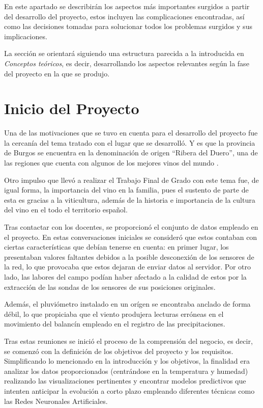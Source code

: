 
En este apartado se describirán los aspectos más importantes surgidos a partir del desarrollo del proyecto,
estos incluyen las complicaciones encontradas, así como las decisiones tomadas para solucionar todos los
problemas surgidos y sus implicaciones.

La sección se orientará siguiendo una estructura parecida a la introducida en \textit{Conceptos teóricos}, 
es decir, desarrollando los aspectos relevantes según la fase del proyecto en la que se produjo.

\section{Inicio del Proyecto}
Una de las motivaciones que se tuvo en cuenta para el desarrollo del proyecto fue la cercanía del tema tratado
con el lugar que se desarrolló. Y es que la provincia de Burgos se encuentra en la denominación de
origen ``Ribera del Duero'', una de las regiones que cuenta con algunos de los mejores vinos del mundo \cite{misc:abc2021}.

Otro impulso que llevó a realizar el Trabajo Final de Grado con este tema fue, de igual forma, la importancia 
del vino en la familia, pues el sustento de parte de esta es gracias a la viticultura, además de la historia
e importancia de la cultura del vino en el todo el territorio español.

Tras contactar con los docentes, se proporcionó el conjunto de datos empleado en el proyecto. En estas conversaciones
iniciales se consideró que estos contaban con ciertas características que debían tenerse en cuenta: en primer lugar,
los presentaban valores faltantes debidos a la posible desconexión de los sensores de la red, lo que provocaba
que estos dejaran de enviar datos al servidor. Por otro lado, las labores del campo podían haber afectado a la calidad
de estos por la extracción de las sondas de los sensores de sus posiciones originales.

Además, el pluviómetro instalado en un orígen se encontraba anclado de forma débil, lo que propiciaba que el viento 
produjera lecturas erróneas en el movimiento del balancín empleado en el registro de las precipitaciones.

Tras estas reuniones se inició el proceso de la comprensión del negocio, es decir, se comenzó con la definición de los 
objetivos del proyecto y los requisitos. Simplificando lo mencionado en la introducción y los objetivos,
la finalidad era analizar los datos proporcionados (centrándose en la temperatura y humedad) realizando
las visualizaciones pertinentes y encontrar modelos predictivos que intenten anticipar la evolución a corto plazo
empleando diferentes técnicas como las Redes Neuronales Artificiales.


